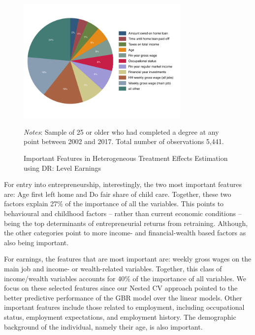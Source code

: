 \documentclass[12pt, a4paper]{article}
\begin{document}
\begin{figure}[htbp]
\centering
\caption{Important Features in Heterogeneous Treatment Effects Estimation using DR: Level Earnings}
\vspace{0.5cm}
  \label{fig:featgbrDR}
    \includegraphics[width=0.75\textwidth]{_figures/DR_influenceP_GBR_le_100.pdf}
\parbox{1\textwidth}{\footnotesize{\textit{Notes}: Sample of 25 or older who had completed a degree at any point between 2002 and 2017. Total number of observations 5,441.}}
\end{figure}
\doublespacing

For entry into entrepreneurship, interestingly, the two most important features are: Age first left home and Do fair share of child care. Together, these two factors explain 27\% of the importance of all the variables. This points to behavioural and childhood factors -- rather than current economic conditions -- being the top determinants of entrepreneurial returns from retraining. Although, the other categories point to more income- and financial-wealth based factors as also being important. 

For earnings, the features that are most important are: weekly gross
wages on the main job and income- or wealth-related variables. Together, this
class of income/wealth variables accounts for 40\% of the importance of all
variables. We focus on these selected features since our Nested CV approach
pointed to the better predictive performance of the GBR model over the linear
models. Other important features include those related to employment, including
occupational status, employment expectations, and employment history. The
demographic background of the individual, namely their age, is also important. 

\end{document}
